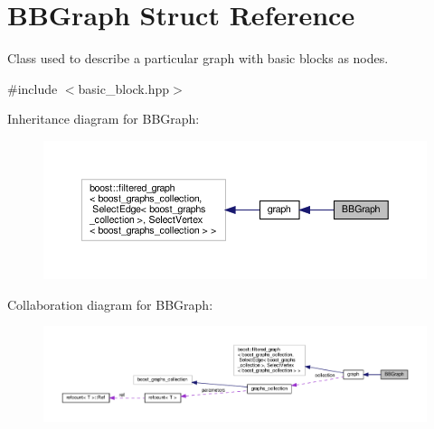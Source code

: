 \hypertarget{structBBGraph}{}\section{B\+B\+Graph Struct Reference}
\label{structBBGraph}


Class used to describe a particular graph with basic blocks as nodes.  




{\ttfamily \#include $<$basic\+\_\+block.\+hpp$>$}



Inheritance diagram for B\+B\+Graph\+:
\nopagebreak
\begin{figure}[H]
\begin{center}
\leavevmode
\includegraphics[width=350pt]{dc/da9/structBBGraph__inherit__graph}
\end{center}
\end{figure}


Collaboration diagram for B\+B\+Graph\+:
\nopagebreak
\begin{figure}[H]
\begin{center}
\leavevmode
\includegraphics[width=350pt]{d0/d50/structBBGraph__coll__graph}
\end{center}
\end{figure}

